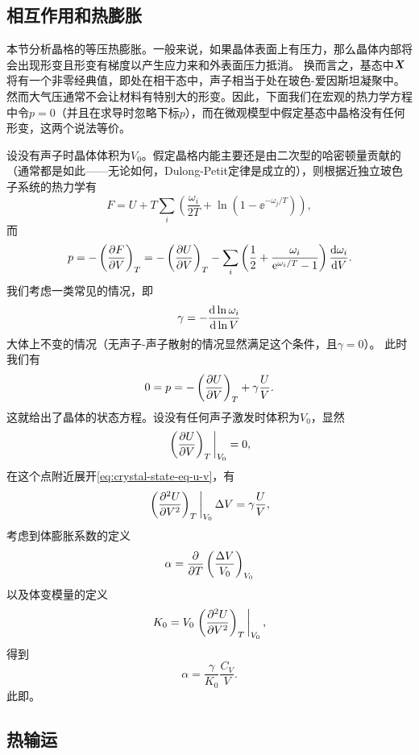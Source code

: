 \subsection{相互作用和热膨胀}

本节分析晶格的等压热膨胀。一般来说，如果晶体表面上有压力，那么晶体内部将会出现形变且形变有梯度以产生应力来和外表面压力抵消。
换而言之，基态中$\vb*{X}$将有一个非零经典值，即处在相干态中，声子相当于处在玻色-爱因斯坦凝聚中。
然而大气压通常不会让材料有特别大的形变。因此，下面我们在宏观的热力学方程中令$p=0$（并且在求导时忽略下标$p$），而在微观模型中假定基态中晶格没有任何形变，这两个说法等价。

设没有声子时晶体体积为$V_0$。假定晶格内能主要还是由二次型的哈密顿量贡献的（通常都是如此——无论如何，Dulong-Petit定律是成立的），则根据近独立玻色子系统的热力学有
\[
    F = U + T \sum_i \left( \frac{\omega_i}{2 T} + \ln(1 - \ee^{- \omega_j / T}) \right),
\]
而
\[
    p = - \left(\pdv{F}{V}\right)_{T} = - \left(\pdv{U}{V}\right)_T - \sum_i \left( \frac{1}{2} + \frac{\omega_i}{\mathrm{e}^{\omega_i / T} - 1} \right) \dv{\omega_i}{V}.
\]
我们考虑一类常见的情况，即
\begin{equation}
    \gamma = - \dv{\ln \omega_i}{\ln V}
\end{equation}
大体上不变的情况（无声子-声子散射的情况显然满足这个条件，且$\gamma = 0$）。
此时我们有
\begin{equation}
    0 = p = - \left(\pdv{U}{V}\right)_T + \gamma \frac{U}{V}.
    \label{eq:crystal-state-eq-u-v}
\end{equation}
这就给出了晶体的状态方程。设没有任何声子激发时体积为$V_0$，显然
\[
    \eval{\left(\pdv{U}{V}\right)_T}_{V_0} = 0,
\]
在这个点附近展开\eqref{eq:crystal-state-eq-u-v}，有
\[
    \eval{\left(\pdv[2]{U}{V}\right)_T}_{V_0} \Delta V = \gamma \frac{U}{V},
\]
考虑到体膨胀系数的定义
\[
    \alpha = \pdv{T} \left(\frac{\Delta V}{V_0}\right)_{V_0}
\]
以及体变模量的定义
\[
    K_0 = V_0 \eval{\left(\pdv[2]{U}{V}\right)_T}_{V_0},
\]
得到
\begin{equation}
    \alpha = \frac{\gamma}{K_0} \frac{C_V}{V}.
\end{equation}
此即。

\subsection{热输运}

